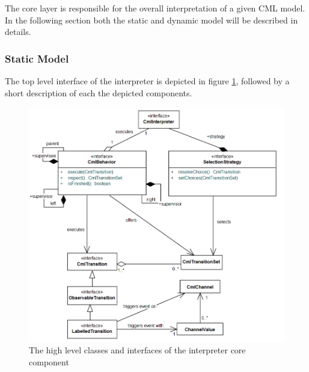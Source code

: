 \documentclass[a4paper, 10pt]{include/compassreport}   %
\begin{document}
The core layer is responsible for the overall interpretation of a
given CML model. In the following section both the static and dynamic
model will be described in details.

\subsubsection{Static Model}
\label{sec:static_structure}

The top level interface of the interpreter is depicted in figure
\ref{fig:interpreter_topLevelStructure}, followed by a short
description of each the depicted components.

\begin{figure}[ht!]
  \begin{center}
    \includegraphics[width=1\textwidth]{figures/toplevelStructure}
    \caption{The high level classes and interfaces of the interpreter core component}
    \label{fig:interpreter_topLevelStructure}
  \end{center}
\end{figure}
\end{document}
